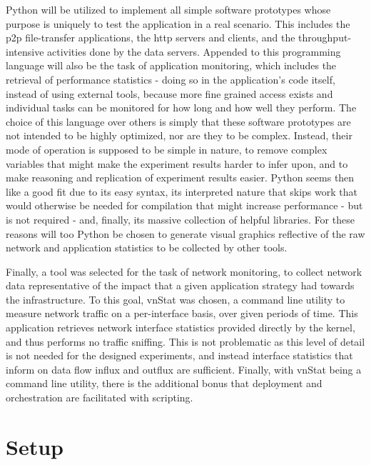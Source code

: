     Python \cite{python} will be utilized to implement all simple software prototypes whose purpose is uniquely to test the application in a real scenario. \cite{python}
    This includes the \gls{p2p} file-transfer applications, the \gls{http} servers and clients, and the throughput-intensive activities done by the data servers.
    Appended to this programming language will also be the task of application monitoring, which includes the retrieval of performance statistics - doing so in the application's code itself, instead of using external tools, because more fine grained access exists and individual tasks can be monitored for how long and how well they perform.
    The choice of this language over others is simply that these software prototypes are not intended to be highly optimized, nor are they to be complex.
    Instead, their mode of operation is supposed to be simple in nature, to remove complex variables that might make the experiment results harder to infer upon, and to make reasoning and replication of experiment results easier.
    Python seems then like a good fit due to its easy syntax, its interpreted nature that skips work that would otherwise be needed for compilation that might increase performance - but is not required - and, finally, its massive collection of helpful libraries.
    For these reasons will too Python be chosen to generate visual graphics reflective of the raw network and application statistics to be collected by other tools.

    Finally, a tool was selected for the task of network monitoring, to collect network data representative of the impact that a given application strategy had towards the infrastructure.
    To this goal, vnStat \cite{vnstat} was chosen, a command line utility to measure network traffic on a per-interface basis, over given periods of time.
    This application retrieves network interface statistics provided directly by the kernel, and thus performs no traffic sniffing.
    This is not problematic as this level of detail is not needed for the designed experiments, and instead interface statistics that inform on data flow influx and outflux are sufficient.
    Finally, with vnStat being a command line utility, there is the additional bonus that deployment and orchestration are facilitated with scripting.

\section{Setup}

